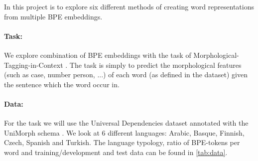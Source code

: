 \documentclass[11pt]{article}
\begin{document}
    In this project is to explore six different methods of creating word representations from multiple BPE embeddings.
	
    
    
    \paragraph{Task:} We explore combination of BPE embeddings with the task of Morphological-Tagging-in-Context \citep{mccarthy2019sigmorphon}. 
    The task is simply to predict the morphological features (such as case, number person, ...) of each word (as defined in the dataset) given the sentence which the word occur in.
    
    \paragraph{Data:} For the task we will use the Universal Dependencies dataset \citep{nivre2018} annotated with the UniMorph schema \citep{mccarthy2018marrying}. We look at 6 different languages: Arabic, Basque, Finnish, Czech, Spanish and Turkish. The language typology, ratio of BPE-tokens per word and training/development and test data can be found in \cref{tab:data}.
    
\end{document}
